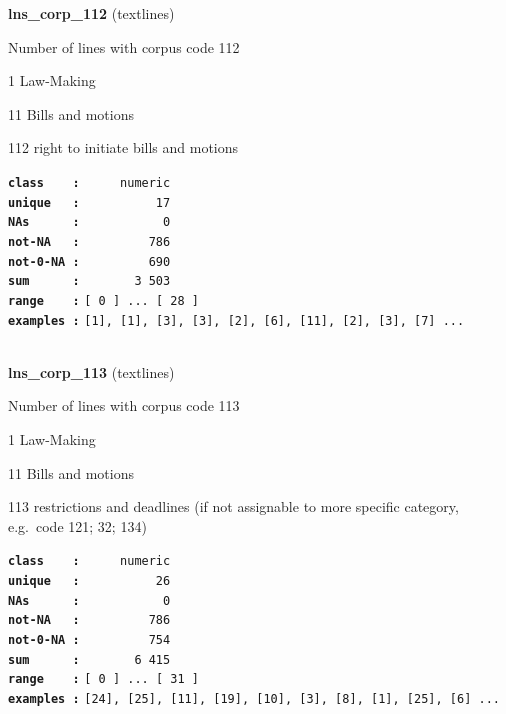 \documentclass[]{article}
\begin{document}
\textbf{lns\_corp\_112} (textlines)

Number of lines with corpus code 112

1 Law-Making

11 Bills and motions

112 right to initiate bills and motions

\textbf{\texttt{class\ \ \ \ :}} \texttt{~~~~~numeric}\\
\textbf{\texttt{unique\ \ \ :}} \texttt{~~~~~~~~~~17}\\
\textbf{\texttt{NAs\ \ \ \ \ \ :}} \texttt{~~~~~~~~~~~0}\\
\textbf{\texttt{not-NA\ \ \ :}} \texttt{~~~~~~~~~786}\\
\textbf{\texttt{not-0-NA\ :}} \texttt{~~~~~~~~~690}\\
\textbf{\texttt{sum\ \ \ \ \ \ :}} \texttt{~~~~~~~3~503}\\
\textbf{\texttt{range\ \ \ \ :}}
\texttt{{[}\ 0\ {]}\ ...\ {[}\ 28\ {]}}\\
\textbf{\texttt{examples\ :}}
\texttt{{[}1{]},\ {[}1{]},\ {[}3{]},\ {[}3{]},\ {[}2{]},\ {[}6{]},\ {[}11{]},\ {[}2{]},\ {[}3{]},\ {[}7{]}\ ...}\\

~

\textbf{lns\_corp\_113} (textlines)

Number of lines with corpus code 113

1 Law-Making

11 Bills and motions

113 restrictions and deadlines (if not assignable to more specific
category, e.g.~code 121; 32; 134)

\textbf{\texttt{class\ \ \ \ :}} \texttt{~~~~~numeric}\\
\textbf{\texttt{unique\ \ \ :}} \texttt{~~~~~~~~~~26}\\
\textbf{\texttt{NAs\ \ \ \ \ \ :}} \texttt{~~~~~~~~~~~0}\\
\textbf{\texttt{not-NA\ \ \ :}} \texttt{~~~~~~~~~786}\\
\textbf{\texttt{not-0-NA\ :}} \texttt{~~~~~~~~~754}\\
\textbf{\texttt{sum\ \ \ \ \ \ :}} \texttt{~~~~~~~6~415}\\
\textbf{\texttt{range\ \ \ \ :}}
\texttt{{[}\ 0\ {]}\ ...\ {[}\ 31\ {]}}\\
\textbf{\texttt{examples\ :}}
\texttt{{[}24{]},\ {[}25{]},\ {[}11{]},\ {[}19{]},\ {[}10{]},\ {[}3{]},\ {[}8{]},\ {[}1{]},\ {[}25{]},\ {[}6{]}\ ...}\\
\end{document}
